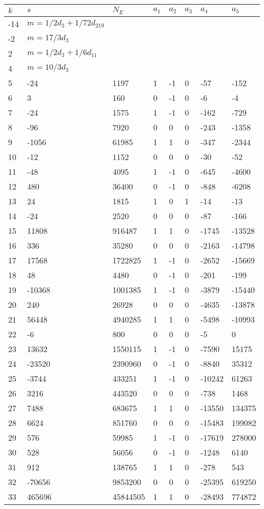 \documentclass{amsart}
\begin{document}
\begin{longtable}{|l|l|l|lllll|}
\hline
$k$ & $s$ & $N_E$ & $a_1$ & $a_2$ & $a_3$ & $a_4$ & $a_5$\\
\hline
-14&$m=1/2d_{3}+1/72d_{219}$&&\multicolumn{5}{c|}{}\\
-2&$m=17/3d_{3}$&&\multicolumn{5}{c|}{}\\
2&$m=1/2d_{3}+1/6d_{11}$&&\multicolumn{5}{c|}{}\\
4&$m=10/3d_{3}$&&\multicolumn{5}{c|}{}\\
5&-24&1197&1&-1&0&-57&-152\\
6&3&160&0&-1&0&-6&-4\\
7&-24&1575&1&-1&0&-162&-729\\
8&-96&7920&0&0&0&-243&-1358\\
9&-1056&61985&1&1&0&-347&-2344\\
10&-12&1152&0&0&0&-30&-52\\
11&-48&4095&1&-1&0&-645&-4600\\
12&480&36400&0&-1&0&-848&-6208\\
13&24&1815&1&0&1&-14&-13\\
14&-24&2520&0&0&0&-87&-166\\
15&11808&916487&1&1&0&-1745&-13528\\
16&336&35280&0&0&0&-2163&-14798\\
17&17568&1722825&1&-1&0&-2652&-15669\\
18&48&4480&0&-1&0&-201&-199\\
19&-10368&1001385&1&-1&0&-3879&-15440\\
20&240&26928&0&0&0&-4635&-13878\\
21&56448&4940285&1&1&0&-5498&-10993\\
22&-6&800&0&0&0&-5&0\\
23&13632&1550115&1&-1&0&-7590&15175\\
24&-23520&2390960&0&-1&0&-8840&35312\\
25&-3744&433251&1&-1&0&-10242&61263\\
26&3216&443520&0&0&0&-738&1468\\
27&7488&683675&1&1&0&-13550&134375\\
28&6624&851760&0&0&0&-15483&199082\\
29&576&59985&1&-1&0&-17619&278000\\
30&528&56056&0&-1&0&-1248&6140\\
31&912&138765&1&1&0&-278&543\\
32&-70656&9853200&0&0&0&-25395&619250\\
33&465696&45844505&1&1&0&-28493&774872\\

\end{longtable}
\end{document}
